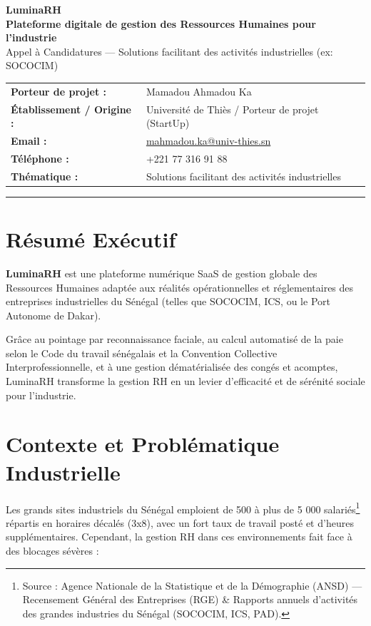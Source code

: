 \documentclass[11pt,a4paper]{article}
\begin{document}
\begin{tcolorbox}[colback=primary,colframe=primary,arc=4mm,boxrule=0pt,top=15pt,bottom=15pt,left=15pt,right=15pt]
    \centering
    {\Huge \color{white} \textbf{LuminaRH}} \\[8pt]
    {\Large \color{white} \textbf{Plateforme digitale de gestion des Ressources Humaines pour l'industrie}} \\[12pt]
    {\small \color{white} Appel à Candidatures — Solutions facilitant des activités industrielles (ex: SOCOCIM)}
\end{tcolorbox}

\vspace{1em}

\begin{table}[h!]
\centering
\small
\begin{tabular}{ll}
\textbf{Porteur de projet :} & Mamadou Ahmadou Ka \\
\textbf{Établissement / Origine :} & Université de Thiès / Porteur de projet (StartUp) \\
\textbf{Email :} & \href{mailto:mahmadou.ka@univ-thies.sn}{mahmadou.ka@univ-thies.sn} \\
\textbf{Téléphone :} & +221 77 316 91 88 \\
\textbf{Thématique :} & Solutions facilitant des activités industrielles \\
\end{tabular}
\end{table}

\hrule
\vspace{1.5em}

\section{Résumé Exécutif}
\textbf{LuminaRH} est une plateforme numérique SaaS de gestion globale des Ressources Humaines adaptée aux réalités opérationnelles et réglementaires des entreprises industrielles du Sénégal (telles que SOCOCIM, ICS, ou le Port Autonome de Dakar). 

Grâce au pointage par reconnaissance faciale, au calcul automatisé de la paie selon le Code du travail sénégalais et la Convention Collective Interprofessionnelle, et à une gestion dématérialisée des congés et acomptes, LuminaRH transforme la gestion RH en un levier d'efficacité et de sérénité sociale pour l'industrie.

\section{Contexte et Problématique Industrielle}
Les grands sites industriels du Sénégal emploient de 500 à plus de 5 000 salariés\footnote{Source : Agence Nationale de la Statistique et de la Démographie (ANSD) — Recensement Général des Entreprises (RGE) \& Rapports annuels d'activités des grandes industries du Sénégal (SOCOCIM, ICS, PAD).} répartis en horaires décalés (3x8), avec un fort taux de travail posté et d'heures supplémentaires. Cependant, la gestion RH dans ces environnements fait face à des blocages sévères :
\end{document}
